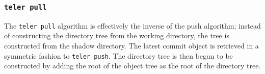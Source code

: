 \documentclass[12pt, letterpaper]{article}
\begin{document}
\begin{multicols}{2}
\begin{center}
\begin{minipage}{.2\textwidth}
\begin{tikzpicture}[scale=0.85]
      \end{tikzpicture}
    \end{minipage}
    \begin{minipage}{.25\textwidth}
    \end{minipage}
  \end{center}


  \subsubsection{\texttt{teler pull}}
  \label{subsubsec:pull}
  The \texttt{teler pull} algorithm is effectively the inverse of the
  push algorithm; instead of constructing the directory tree
  from the working directory, the tree is constructed from the shadow
  directory. The latest commit object is retrieved in a symmetric
  fashion to \texttt{teler push}. The directory tree is then begun to
  be constructed by adding the root of the object tree as the root of
  the directory tree.


\end{multicols}
\end{document}
